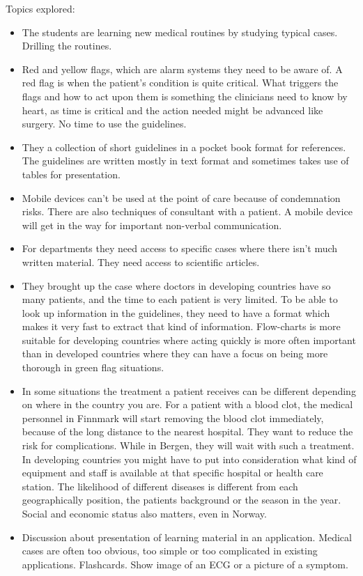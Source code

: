 Topics explored:
\begin{itemize}
	\item The students are learning new medical routines by studying typical cases. Drilling the routines.
	\item Red and yellow flags, which are alarm systems they need to be aware of. A red flag is when the patient's condition is quite critical. What triggers the flags and how to act upon them is something the clinicians need to know by heart, as time is critical and the action needed might be advanced like surgery. No time to use the guidelines.
	\item They a collection of short guidelines in a pocket book format for references. The guidelines are written mostly in text format and sometimes takes use of tables for presentation.
	\item Mobile devices can't be used at the point of care because of condemnation risks. There are also techniques of consultant with a patient. A mobile device will get in the way for important non-verbal communication.
	\item For departments they need access to specific cases where there isn't much written material. They need access to scientific articles.
	\item They brought up the case where doctors in developing countries have so many patients, and the time to each patient is very limited. To be able to look up information in the guidelines, they need to have a format which makes it very fast to extract that kind of information. Flow-charts is more suitable for developing countries where acting quickly is more often important than in developed countries where they can have a focus on being more thorough in green flag situations.
	\item In some situations the treatment a patient receives can be different depending on where in the country you are. For a patient with a blood clot, the medical personnel in Finnmark will start removing the blood clot immediately, because of the long distance to the nearest hospital. They want to reduce the risk for complications. While in Bergen, they will wait with such a treatment. In developing countries you might have to put into consideration what kind of equipment and staff is available at that specific hospital or health care station. The likelihood of different diseases is different from each geographically position, the patients background or the season in the year. Social and economic status also matters, even in Norway.
	\item Discussion about presentation of learning material in an application. Medical cases are often too obvious, too simple or too complicated in existing applications. Flashcards. Show image of an ECG or a picture of a symptom.

\end{itemize}
